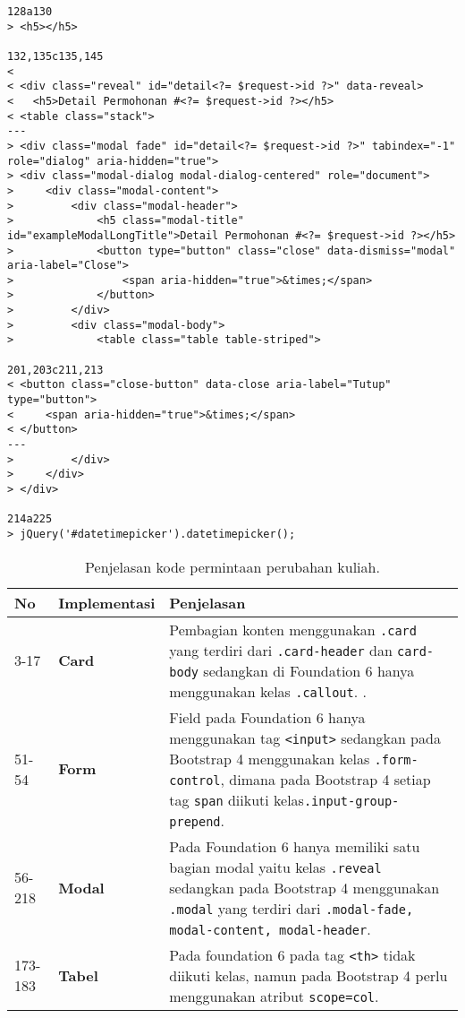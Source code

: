 \begin{lstlisting}
128a130
> <h5></h5>

132,135c135,145
< 
< <div class="reveal" id="detail<?= $request->id ?>" data-reveal>
< 	<h5>Detail Permohonan #<?= $request->id ?></h5>
< <table class="stack">
---
> <div class="modal fade" id="detail<?= $request->id ?>" tabindex="-1" role="dialog" aria-hidden="true">
> <div class="modal-dialog modal-dialog-centered" role="document">
>     <div class="modal-content">
>         <div class="modal-header">
>             <h5 class="modal-title" id="exampleModalLongTitle">Detail Permohonan #<?= $request->id ?></h5>
>             <button type="button" class="close" data-dismiss="modal" aria-label="Close">
>                 <span aria-hidden="true">&times;</span>
>             </button>
>         </div>
>         <div class="modal-body">
>             <table class="table table-striped">

201,203c211,213
< <button class="close-button" data-close aria-label="Tutup" type="button">
<     <span aria-hidden="true">&times;</span>
< </button>
---
>         </div>
>     </div>
> </div>

214a225
> jQuery('#datetimepicker').datetimepicker();
\end{lstlisting}

\begin{table}[H]
	\centering
	\caption{Penjelasan kode permintaan perubahan kuliah.}
	\begin{tabularx}{\textwidth}{llX}
		\toprule
		No & Implementasi     & Penjelasan \\
		\midrule
		3-17 & \textbf{Card} & Pembagian konten menggunakan \texttt{.card} yang terdiri dari \texttt{.card-header} dan \texttt{card-body} sedangkan di Foundation 6 hanya menggunakan kelas \texttt{.callout}. .\\
		51-54 & \textbf{Form}  & Field pada Foundation 6 hanya menggunakan tag \texttt{<input>} sedangkan pada Bootstrap 4 menggunakan kelas \texttt{.form-control}, dimana pada Bootstrap 4 setiap tag \texttt{span} diikuti kelas\texttt{.input-group-prepend}.\\
		56-218 & \textbf{Modal}  & Pada Foundation 6 hanya memiliki satu bagian modal yaitu kelas \texttt{.reveal} sedangkan pada Bootstrap 4 menggunakan \texttt{.modal} yang terdiri dari \texttt{.modal-fade, modal-content, modal-header}.\\
		173-183 &\textbf{Tabel} & Pada foundation 6 pada tag \texttt{<th>} tidak diikuti kelas, namun pada Bootstrap 4 perlu menggunakan atribut \texttt{scope=col}.\\
		\bottomrule
	\end{tabularx}%
	\label{tabel:permintaanPerubahanKuliah}
\end{table}

